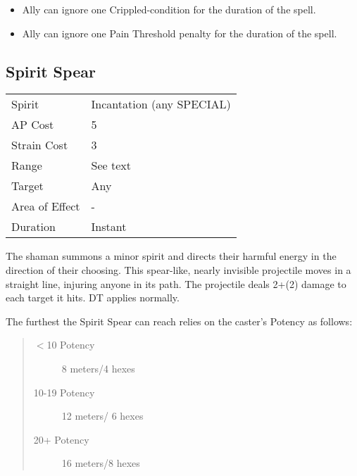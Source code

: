 \documentclass[11pt,a4paper,twocolumn]{book}
\begin{document}
\begin{itemize}
	\item Ally can ignore one Crippled-condition for the duration of the spell.
	\item Ally can ignore one Pain Threshold penalty for the duration of the spell.
\end{itemize}

\subsection*{Spirit Spear}
{
	\begin{tabu} to 75mm{| X[l,4] | X[l,7] |}
		\hline
		Spirit         & Incantation (any SPECIAL) \\
		AP Cost        & 5                         \\
		Strain Cost    & 3                         \\
		Range          & See text                  \\
		Target         & Any                       \\
		Area of Effect & -                         \\
		Duration       & Instant                   \\ \hline
	\end{tabu}
	
}

\medskip

The shaman summons a minor spirit and directs their harmful energy in the direction of their choosing. This spear-like, nearly invisible projectile moves in a straight line, injuring anyone in its path. The projectile deals 2+(2) damage to each target it hits. DT applies normally.

The furthest the Spirit Spear can reach relies on the caster's Potency as follows:
\begin{quote}
	\begin{description}
		\item[$<$10 Potency] 	8 meters/4 hexes
		\item[10-19 Potency] 	12 meters/ 6 hexes
		\item[20+ Potency]  	16 meters/8 hexes
	\end{description}	
\end{quote}
\end{document}
